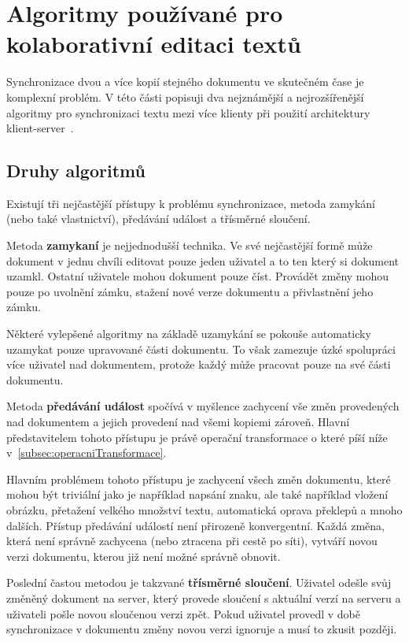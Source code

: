 
\section{Algoritmy používané pro kolaborativní editaci textů}\label{sec:algoritmyProKolaborativníEditaci}

Synchronizace dvou a více kopií stejného dokumentu ve skutečném čase je komplexní problém.
V této části popisuji dva nejznámější a nejrozšířenější algoritmy pro synchronizaci textu mezi více klienty při použití architektury klient-server~\cite{algoritmy:first}.

\subsection{Druhy algoritmů}

Existují tři nejčastější přístupy k problému synchronizace, metoda zamykání (nebo také vlastnictví), předávání událost a třísměrné sloučení.

Metoda \textbf{zamykaní} je nejjednodušší technika.
Ve své nejčastější formě může dokument v jednu chvíli editovat pouze jeden uživatel a to ten který si dokument uzamkl.
Ostatní uživatele mohou dokument pouze číst.
Provádět změny mohou pouze po uvolnění zámku, stažení nové verze dokumentu a přivlastnění jeho zámku.

Některé vylepšené algoritmy na základě uzamykání se pokouše automaticky uzamykat pouze upravované části dokumentu.
To však zamezuje úzké spolupráci více uživatel nad dokumentem, protože každý může pracovat pouze na své části dokumentu.

Metoda \textbf{předávání událost} spočívá v myšlence zachycení vše změn provedených nad dokumentem a jejich provedení nad všemi kopiemi zároveň.
Hlavní představitelem tohoto přístupu je právě operační transformace o které píší níže v~\ref{subsec:operacniTransformace}.

Hlavním problémem tohoto přístupu je zachycení všech změn dokumentu, které mohou být triviální jako je například napsání znaku, ale také například vložení obrázku, přetažení velkého množství textu, automatická oprava překlepů a mnoho dalších.
Přístup předávání událostí není přirozeně konvergentní.
Každá změna, která není správně zachycena (nebo ztracena při cestě po síti), vytváří novou verzi dokumentu, kterou již není možné správně obnovit.

Poslední častou metodou je takzvané \textbf{třísměrné sloučení}.
Uživatel odešle svůj změněný dokument na server, který provede sloučení s aktuální verzí na serveru a uživateli pošle novou sloučenou verzi zpět.
Pokud uživatel provedl v době synchronizace v dokumentu změny novou verzi ignoruje a musí to zkusit později.

